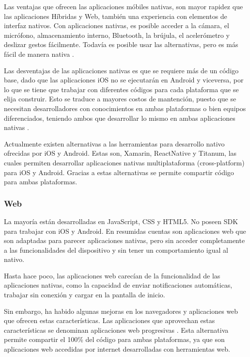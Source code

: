 	Las ventajas que ofrecen las aplicaciones móbiles nativas, son mayor rapidez que las aplicaciones Híbridas y Web, también una experiencia con elementos de interfaz nativos. Con aplicaciones nativas, es posible acceder a la cámara, el micrófono, almacenamiento interno, Bluetooth, la brújula, el acelerómetro y deslizar gestos fácilmente. Todavía es posible usar las alternativas, pero es más fácil de manera nativa \citep{mobile-apps-types}.
	
	Las desventajas de las aplicaciones nativas es que se requiere más de un código base, dado que las aplicaciones iOS no se ejecutarán en Android y viceversa, por lo que se tiene que trabajar con diferentes códigos para cada plataforma que se elija construir. Esto se traduce a mayores costos de mantención, puesto que se  necesitan desarrolladores con conocimientos en ambas plataformas o bien equipos diferenciados, teniendo ambos que desarrollar lo mismo en ambas aplicaciones nativas \citep{mobile-apps-types}.

Actualmente existen alternativas a las herramientas para desarrollo nativo ofrecidas por iOS y Android. Estas son, Xamarin, ReactNative y Titanum, las cuales permiten desarrollar aplicaciones nativas multiplataforma (cross-platform) para iOS y Android. Gracias a estas alternativas se permite compartir código para ambas plataformas. 
	
	\subsubsection{Web}
	La mayoría están desarrolladas en JavaScript, CSS y HTML5. No poseen SDK para trabajar con iOS y Android. En resumidas cuentas son aplicaciones web que son adaptadas para parecer aplicaciones nativas, pero sin acceder completamente a las funcionalidades del dispositivo y sin tener un comportamiento igual al nativo. 
	
	Hasta hace poco, las aplicaciones web carecían de la funcionalidad de las aplicaciones nativas, como la capacidad de enviar notificaciones automáticas, trabajar sin conexión y cargar en la pantalla de inicio.

Sin embargo, ha habido algunas mejoras en los navegadores y aplicaciones web que ofrecen estas características. Las aplicaciones que aprovechan estas características se denominan aplicaciones web progresivas \citep{mobile-apps-types}. Esta alternativa permite compartir el 100\% del código para ambas plataformas, ya que son aplicaciones web accedidas por internet desarrolladas con herramientas web.
	
